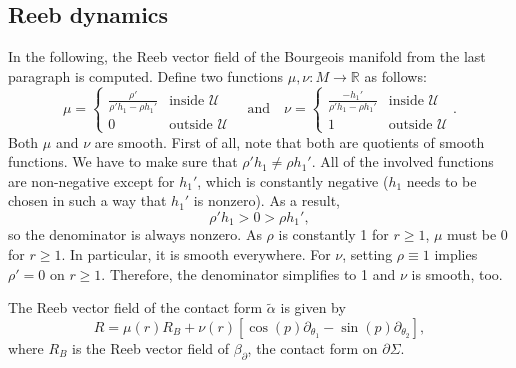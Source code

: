 \subsection{Reeb dynamics}\label{reeb_dynamics}
In the following, the Reeb vector field of the Bourgeois manifold from the last paragraph is computed.
Define two functions $\mu, \nu: M \to \mathbb R$ as follows:
\[
    \mu = \begin{cases}
        \frac{\rho'}{\rho' h_1 - \rho h_1'} &\text{inside } \mathcal{U}\\
        0 &\text{outside } \mathcal{U} 
    \end{cases}  
    \quad \text{and} \quad 
    \nu = \begin{cases}
        \frac{-h_1'}{\rho' h_1 - \rho h_1'} &\text{inside } \mathcal{U}\\
        1 &\text{outside } \mathcal{U}
    \end{cases}.
\]
Both $\mu$ and $\nu$ are smooth.
First of all, note that both are quotients of smooth functions.
We have to make sure that $\rho'h_1 \neq \rho h_1'$.
All of the involved functions are non-negative except for $h_1'$, which is constantly negative ($h_1$ needs to be chosen in such a way that $h_1'$ is nonzero). As a result,
\[
    \rho'h_1 > 0 > \rho h_1',
\]
so the denominator is always nonzero.
As $\rho$ is constantly 1 for $r \geq 1$, $\mu$ must be 0 for $r \geq 1$.
In particular, it is smooth everywhere. For $\nu$, setting $\rho \equiv 1$ implies $\rho' = 0$ on $r \geq 1$. Therefore, the denominator simplifies to 1 and $\nu$ is smooth, too.
\begin{lemma}
    The Reeb vector field of the contact form $\tilde \alpha$ is given by
    \[
        R = \mu(r)R_B + \nu(r)[\cos(p)\partial_{\theta_1} - \sin(p)\partial_{\theta_2}],
    \]
    where $R_B$ is the Reeb vector field of $\beta_\partial$, the contact form on $\partial \Sigma$.
\end{lemma}
